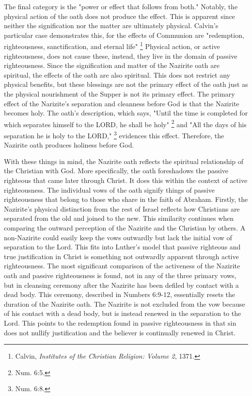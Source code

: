 \documentclass[12pt]{turabian-researchpaper}
\begin{document}
\par
The final category is the "power or effect that follows from both."
Notably, the physical action of the oath does not produce the effect. 
This is apparent since neither the signification nor the matter are  ultimately physical. 
Calvin's particular case demonstrates this, for the effects of Communion are "redemption, righteousness, sanctification, and eternal life" \footnote{Calvin, \textit{Institutes of the Christian Religion: Volume 2}, 1371.} 
Physical action, or active righteousness, does not cause these, instead, they live in the domain of passive righteousness.
Since the signification and matter of the Nazirite oath are spiritual, the effects of the oath are also spiritual. 
This does not restrict any physical benefits, but these blessings are not the primary effect of the oath just as the physical nourishment of the Supper is not its primary effect. 
The primary effect of the Narizite's separation and cleanness before God is that the Nazirite becomes holy. 
The oath's description, which says, "Until the time is completed for which separates himself to the LORD, he shall be holy" \footnote{Num. 6:5.} and "All the days of his separation he is holy to the LORD," \footnote{Num. 6:8.} evidences this effect. 
Therefore, the Nazirite oath produces holiness before God.


\par
With these things in mind, the Nazirite oath reflects the spiritual relationship of the Christian with God. 
More specifically, the oath foreshadows the passive righteous that came later through Christ.
It does this within the context of active righteousness.
The individual vows of the oath signify things of passive righteousness that belong to those who share in the faith of Abraham.
Firstly, the Nazirite's physical distinction from the rest of Israel reflects how Christians are separated from the old and joined to the new.
This similarity continues when comparing the outward perception of the Nazirite and the Christian by others.
A non-Nazirite could easily keep the vows outwardly but lack the initial vow of separation to the Lord.
This fits into Luther's model that passive righteous and true justification in Christ is something not outwardly apparent through active righteousness. 
The most significant comparison of the activeness of the Nazirite oath and passive righteousness is found, not in any of the three primary vows, but in cleansing ceremony after the Nazirite has been defiled by contact with a dead body.
This ceremony, described in Numbers 6:9-12, essentially resets the duration of the Nazirite oath. 
The Nazirite is not excluded from the vow because of his contact with a dead body, but is instead renewed in the separation to the Lord.
This points to the redemption found in passive righteousness in that sin does not nullify justification and the believer is continually renewed in Christ. 
\end{document}
